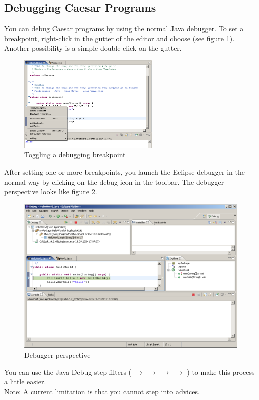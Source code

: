 \subsection{Debugging Caesar Programs}
You can debug Caesar programs by using the normal Java debugger. To set a breakpoint, right-click in the gutter of the editor and choose (see figure \ref{fig:brake_point}). Another possibility is a simple double-click on the gutter.
\begin{figure}[htbp]
	\centering
		\includegraphics[width=0.60\textwidth]{images/brake_point.png}
	\caption{Toggling a debugging breakpoint}
	\label{fig:brake_point}
\end{figure}

After setting one or more breakpoints, you launch the Eclipse debugger in the normal way by clicking on the debug icon in the toolbar. The debugger perspective looks like figure \ref{fig:debuger}.
\begin{figure}[htbp]
	\centering
		\includegraphics[width=1.0\textwidth]{images/debug1.png}
	\caption{Debugger perspective}
	\label{fig:debuger}
\end{figure}

You can use the Java Debug step filters ( $\rightarrow$  $\rightarrow$  $\rightarrow$  $\rightarrow$ ) to make this process a little easier.\\
Note: A current limitation is that you cannot step into advices.